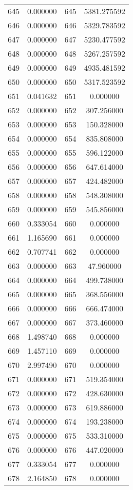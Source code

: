 \documentclass[12pt]{article}
\begin{document}
\begin{longtable}{@{}cccc@{}}
645 & 0.000000 & 645 & 5381.275592 \\
646 & 0.000000 & 646 & 5329.783592 \\
647 & 0.000000 & 647 & 5230.477592 \\
648 & 0.000000 & 648 & 5267.257592 \\
649 & 0.000000 & 649 & 4935.481592 \\
650 & 0.000000 & 650 & 5317.523592 \\
651 & 0.041632 & 651 & 0.000000 \\
652 & 0.000000 & 652 & 307.256000 \\
653 & 0.000000 & 653 & 150.328000 \\
654 & 0.000000 & 654 & 835.808000 \\
655 & 0.000000 & 655 & 596.122000 \\
656 & 0.000000 & 656 & 647.614000 \\
657 & 0.000000 & 657 & 424.482000 \\
658 & 0.000000 & 658 & 548.308000 \\
659 & 0.000000 & 659 & 545.856000 \\
660 & 0.333054 & 660 & 0.000000 \\
661 & 1.165690 & 661 & 0.000000 \\
662 & 0.707741 & 662 & 0.000000 \\
663 & 0.000000 & 663 & 47.960000 \\
664 & 0.000000 & 664 & 499.738000 \\
665 & 0.000000 & 665 & 368.556000 \\
666 & 0.000000 & 666 & 666.474000 \\
667 & 0.000000 & 667 & 373.460000 \\
668 & 1.498740 & 668 & 0.000000 \\
669 & 1.457110 & 669 & 0.000000 \\
670 & 2.997490 & 670 & 0.000000 \\
671 & 0.000000 & 671 & 519.354000 \\
672 & 0.000000 & 672 & 428.630000 \\
673 & 0.000000 & 673 & 619.886000 \\
674 & 0.000000 & 674 & 193.238000 \\
675 & 0.000000 & 675 & 533.310000 \\
676 & 0.000000 & 676 & 447.020000 \\
677 & 0.333054 & 677 & 0.000000 \\
678 & 2.164850 & 678 & 0.000000 \\

\end{longtable}
\end{document}
